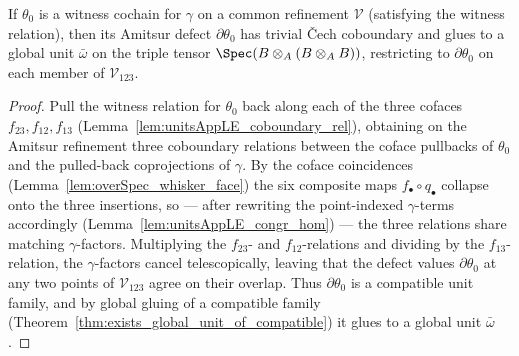 \begin{theorem}
  \label{thm:exists_glued_defect}
  \leanok
  If \(\theta_0\) is a witness cochain for \(\gamma\) on a common refinement \(\mathcal V\)
  (satisfying the witness relation), then its Amitsur defect \(\partial\theta_0\) has trivial
  \v Cech coboundary and glues to a global unit \(\bar\omega\) on the triple tensor
  \(\Spec(B \otimes_A (B \otimes_A B))\), restricting to \(\partial\theta_0\) on each member of
  \(\mathcal V_{123}\).
\end{theorem}
\begin{proof}
  \leanok
  Pull the witness relation for \(\theta_0\) back along each of the three cofaces
  \(f_{23}, f_{12}, f_{13}\) (Lemma~\ref{lem:unitsAppLE_coboundary_rel}), obtaining on the
  Amitsur refinement three coboundary relations between the coface pullbacks of \(\theta_0\) and
  the pulled-back coprojections of \(\gamma\). By the coface coincidences
  (Lemma~\ref{lem:overSpec_whisker_face}) the six composite maps
  \(f_{\bullet} \circ q_{\bullet}\) collapse onto the three insertions, so — after rewriting the
  point-indexed \(\gamma\)-terms accordingly (Lemma~\ref{lem:unitsAppLE_congr_hom}) — the three
  relations share matching \(\gamma\)-factors. Multiplying the \(f_{23}\)- and
  \(f_{12}\)-relations and dividing by the \(f_{13}\)-relation, the \(\gamma\)-factors cancel
  telescopically, leaving that the defect values \(\partial\theta_0\) at any two points of
  \(\mathcal V_{123}\) agree on their overlap. Thus \(\partial\theta_0\) is a compatible unit
  family, and by global gluing of a compatible family
  (Theorem~\ref{thm:exists_global_unit_of_compatible}) it glues to a global unit \(\bar\omega\).
\end{proof}

